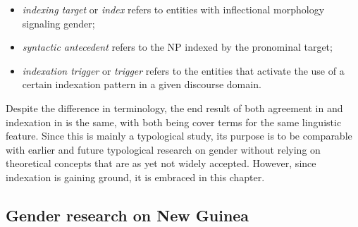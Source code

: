 \documentclass[output=collectionpaper]{langsci/langscibook}
\begin{document}
\begin{itemize}
\item \textit{indexing target} or \textit{index} refers to entities with inflectional morphology signaling gender;
\item \textit{syntactic antecedent} refers to the NP indexed by the pronominal target;
\item \textit{indexation trigger} or \textit{trigger} refers to the entities that activate the use of a certain indexation pattern in a given discourse domain.
\end{itemize}

Despite the difference in terminology, the end result of both agreement in \citet{Corbett1991} and indexation in \citet{DiGarbo2014} is the same, with both being cover terms for the same linguistic feature. Since this is mainly a typological study, its purpose is to be comparable with earlier and future typological research on gender without relying on theoretical concepts that are as yet not widely accepted. However, since indexation is gaining ground, it is embraced in this chapter.

\subsection{Gender research on New Guinea}
\end{document}
